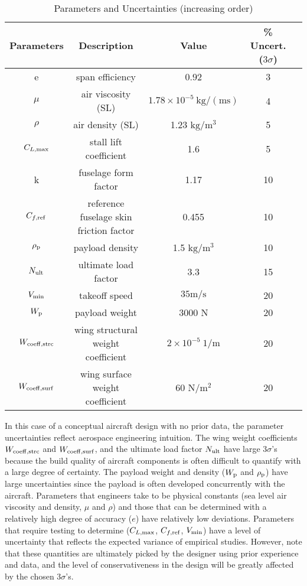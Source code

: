 \begin{table}
\begin{center}
\caption{\label{tab:uncertainties} Parameters and Uncertainties (increasing order)}
\begin{tabular}{c c c c c}
\hline
Parameters & Description & Value & \% Uncert. ($3\sigma$) \\
\hline
e & span efficiency & 0.92 & 3\\
$\mu$ & air viscosity (SL) & $1.78 \times 10^{-5}~\mathrm{kg/(ms)}$ & 4 \\
$\rho$ & air density (SL) & 1.23 $\mathrm{kg/m^3}$ & 5 \\
$C_{L,\rm{max}}$ & stall lift coefficient & 1.6 & 5\\
k & fuselage form factor & 1.17 & 10\\
$C_{f,\rm{ref}}$ & reference fuselage skin friction factor & 0.455 & 10 \\
$\rho_{\rm{p}}$ & payload density & 1.5 $\mathrm{kg/m^3}$ & 10 \\
$N_{\rm{ult}}$ & ultimate load factor & 3.3 & 15\\
$V_{\rm{min}}$ & takeoff speed & $35 \mathrm{m/s}$ & 20\\
$W_{\rm{p}}$ & payload weight & 3000 N & 20\\
$W_{\rm{coeff, strc}}$ & wing structural weight coefficient & $2 \times 10^{-5}~1/\mathrm{m}$ & 20\\
$W_{\rm{coeff,surf}}$ & wing surface weight coefficient & 60 $\mathrm{N/m^2}$ & 20\\
\hline
\end{tabular}
\end{center}
\end{table}

In this case of a conceptual aircraft design with no prior data,
the parameter uncertainties reflect aerospace engineering intuition.
The wing weight coefficients $W_{\rm{coeff, strc}}$ and $W_{\rm{coeff,surf}}$,
and the ultimate load factor $N_{\rm{ult}}$ have
large $3\sigma$'s because the build quality of aircraft components is
often difficult to quantify with a large degree of certainty.
The payload weight and density ($W_{\rm{p}}$ and $\rho_{\rm{p}}$) have large uncertainties
since the payload is often developed concurrently with the aircraft.
Parameters that engineers take to be
physical constants (sea level air viscosity and density, $\mu$ and $\rho$) and those that can be determined with
a relatively high degree of accuracy ($e$) have relatively low deviations.
Parameters that require testing to determine ($C_{L,\rm{max}}$, $C_{f,\rm{ref}}$,
$V_{\rm{min}}$) have a level of uncertainty
that reflects the expected variance of empirical studies. However, note that
these quantities are ultimately picked by the designer using prior experience and data,
and the level of conservativeness in the
design will be greatly affected by the chosen $3\sigma$'s.

